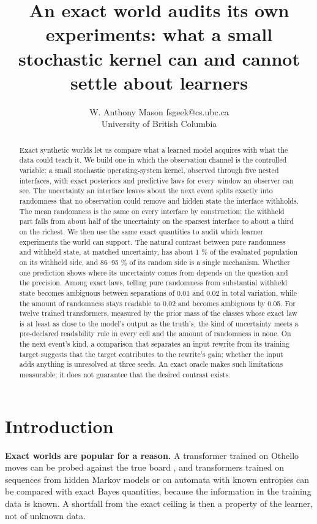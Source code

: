 \documentclass[10pt]{article}
\title{An exact world audits its own experiments: what a small stochastic kernel can and cannot settle about learners}
\author{\name W. Anthony Mason \email fsgeek@cs.ubc.ca \\ \addr University of British Columbia}
\begin{document}
\maketitle
\begin{abstract}
Exact synthetic worlds let us compare what a learned model acquires with what the data could teach it. We build one
in which the observation channel is the controlled variable: a small stochastic operating-system kernel, observed
through five nested interfaces, with exact posteriors and predictive laws for every window an observer can see. The
uncertainty an interface leaves about the next event splits exactly into randomness that no observation could remove
and hidden state the interface withholds. The mean randomness is the same on every interface by construction; the
withheld part falls from about half of the uncertainty on the sparsest interface to about a third on the richest. We
then use the same exact quantities to audit which learner experiments the world can support. The natural contrast
between pure randomness and withheld state, at matched uncertainty, has about 1 \% of the evaluated population on its
withheld side, and 86--95 \% of its random side is a single mechanism. Whether one prediction shows where its
uncertainty comes from depends on the question and the precision. Among exact laws, telling pure randomness from
substantial withheld state becomes ambiguous between separations of 0.01 and 0.02 in total variation, while the
amount of randomness stays readable to 0.02 and becomes ambiguous by 0.05. For twelve trained transformers, measured by
the prior mass of the classes whose exact law is at least as close to the model's output as the truth's, the kind of
uncertainty meets a pre-declared readability rule in every cell and the amount of randomness in none. On the next
event's kind, a comparison that separates an input rewrite from its training target suggests that the target
contributes to the rewrite's gain; whether the input adds anything is unresolved at three seeds. An exact oracle makes
such limitations measurable; it does not guarantee that the desired contrast exists.

\end{abstract}
\hypertarget{introduction}{%
\section{Introduction}\label{introduction}}

\textbf{Exact worlds are popular for a reason.} A transformer trained on Othello moves can be probed against the true board
\citep{li2022emergent}, and transformers trained on sequences from hidden Markov models
\citep{shai2024belief, agarwal2025bayesian} or on automata with known entropies \citep{someya2025locality} can be compared with
exact Bayes quantities, because the information in the training data is known. A shortfall from the exact ceiling is
then a property of the learner, not of unknown data.
\end{document}
